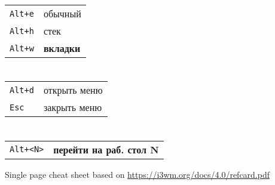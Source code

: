\begin{multicols}{3}
\section{}
\begin{tabular}{@{}ll@{}}
    \verb!Alt+e! & обычный \\
    \verb!Alt+h! & стек \\
    \verb!Alt+w! & \textbf{вкладки} \\
\end{tabular}

\section{}
\begin{tabular}{@{}ll@{}}
	\verb!Alt+d! & открыть меню \\
	\verb!Esc! & закрыть меню \\
\end{tabular}

\section{}
\begin{tabular}{@{}ll@{}}
    \verb!Alt+<N>! & \textbf{перейти на раб. стол N} \\
\end{tabular}

Single page cheat sheet based on \url{https://i3wm.org/docs/4.0/refcard.pdf}

\end{multicols}

